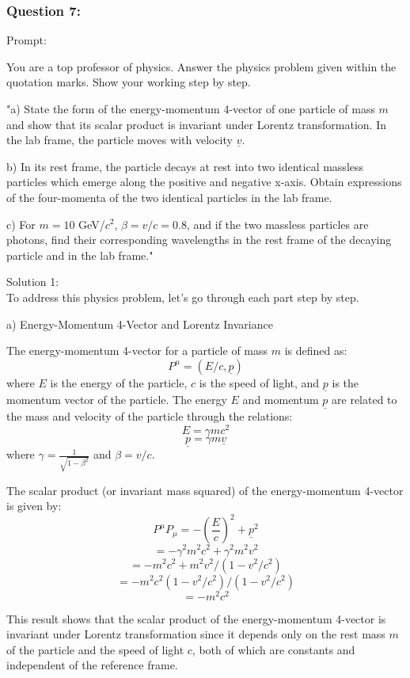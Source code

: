 \documentclass[a4paper,11pt]{article}
\begin{document}
\subsubsection*{Question 7:}

Prompt:
\begin{spverbatim}
    You are a top professor of physics. Answer the physics problem given within the quotation marks. Show your working step by step.

    "a) State the form of the energy-momentum 4-vector of one particle of mass \( m \) and show that its scalar product is invariant under Lorentz transformation. In the lab frame, the particle moves with velocity \( \underline{v} \). 

    b) In its rest frame, the particle decays at rest into two identical massless particles which emerge along the positive and negative x-axis. Obtain expressions of the four-momenta of the two identical particles in the lab frame. 
    
    c) For \( m = 10 \) GeV/\( c^{2} \), \( \beta = v/c = 0.8 \), and if the two massless particles are photons, find their corresponding wavelengths in the rest frame of the decaying particle and in the lab frame."
\end{spverbatim}

\bigskip

\noindent Solution 1: \\

To address this physics problem, let's go through each part step by step.

a) Energy-Momentum 4-Vector and Lorentz Invariance

The energy-momentum 4-vector for a particle of mass $m$ is defined as:
\[ P^\mu = (E/c, \underline{p}) \]
where $E$ is the energy of the particle, $c$ is the speed of light, and $\underline{p}$ is the momentum vector of the particle. The energy $E$ and momentum $\underline{p}$ are related to the mass and velocity of the particle through the relations:
\[ E = \gamma mc^2 \]
\[ \underline{p} = \gamma m \underline{v} \]
where $\gamma = \frac{1}{\sqrt{1 - \beta^2}}$ and $\beta = v/c$.

The scalar product (or invariant mass squared) of the energy-momentum 4-vector is given by:
\[ P^\mu P_\mu = -\left(\frac{E}{c}\right)^2 + \underline{p}^2 \]
\[ = -\gamma^2 m^2 c^2 + \gamma^2 m^2 v^2 \]
\[ = -m^2 c^2 + m^2 v^2 / (1 - v^2/c^2) \]
\[ = -m^2 c^2 (1 - v^2/c^2) / (1 - v^2/c^2) \]
\[ = -m^2 c^2 \]

This result shows that the scalar product of the energy-momentum 4-vector is invariant under Lorentz transformation since it depends only on the rest mass $m$ of the particle and the speed of light $c$, both of which are constants and independent of the reference frame.
\end{document}
